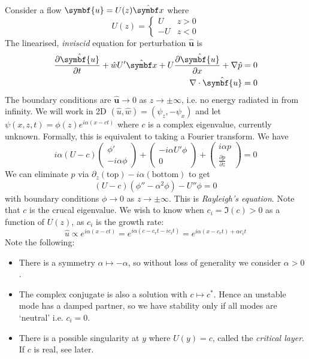 \documentclass{jknotes}
\renewcommand{\u}{\symbf{u}}
\begin{document}
Consider a flow $\u = U(z)\hat{\x}$ where
\begin{equation}
	U(z) = \begin{cases} U & z > 0 \\ -U & z < 0 \end{cases}
\end{equation}
The linearised, \emph{inviscid} equation for perturbation $\hat{\u}$ is
\begin{align}
	\frac{\partial \hat{\u}}{\partial t} + \hat{w}U'\hat{\x} + U
	\frac{\partial \hat{\u}}{\partial x} + \nabla \hat{p} &= 0 \\
	\nabla \cdot \hat{\u} &= 0 
\end{align}
The boundary conditions are $\hat{\u} \to 0$ as $z \to \pm \infty$, i.e. no
energy radiated in from infinity. We will work in 2D $(\hat{u},\hat{w}) =
(\psi_z, -\psi_x)$ and let $\psi(x,z,t) = \phi(z) e^{i\alpha(x-ct)}$ where $c$
is a complex eigenvalue, currently unknown. Formally, this is equivalent to
taking a Fourier transform. We have
\begin{equation}
	i\alpha (U-c) \begin{pmatrix} \phi' \\ -i\alpha \phi \end{pmatrix} +
	\begin{pmatrix} -i\alpha U' \phi \\ 0 \end{pmatrix} + \begin{pmatrix} i
\alpha p \\ \frac{\partial p}{\partial z} \end{pmatrix} = 0
\end{equation}
We can eliminate $p$ via $\partial_z (\text{top}) - i\alpha(\text{bottom})$ to
get
\begin{equation}
	(U-c)(\phi''-\alpha^2 \phi) - U'' \phi = 0
\end{equation}
with boundary conditions $\phi \to 0$ as $z \to \pm \infty$. This is
\emph{Rayleigh's equation}. Note that $c$ is the crucal eigenvalue. We wish to
know when $c_i = \Im(c) > 0$ as a function of $U(z)$, as $c_i$ is the growth
rate:
\begin{equation}
	\hat{u} \propto e^{i\alpha(x-ct)} = e^{i\alpha(c-c_r t - i c_i t)} =
		e^{i\alpha(x-c_r t) + \alpha c_i t}
\end{equation}
Note the following:
\begin{itemize}
	\item There is a symmetry $\alpha \mapsto -\alpha$, so without loss of
		generality we consider $\alpha > 0$.
	\item The complex conjugate is also a solution with $c \mapsto c^*$. Hence
		an unstable mode has a damped partner, so we have stability only if
		all modes are `neutral' i.e. $c_i = 0$. 
	\item There is a possible singularity at $y$ where $U(y) = c$, called the
		\emph{critical layer}. If $c$ is real, see later.
\end{itemize}
\end{document}
